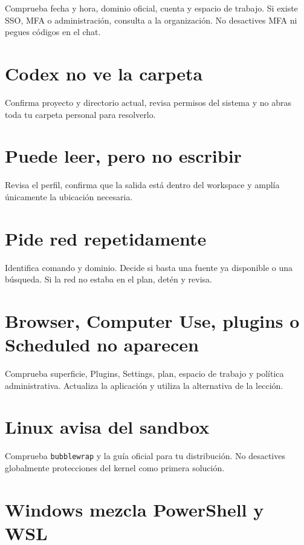 \documentclass[10pt,a4paper,openany]{book}
\begin{document}
Comprueba fecha y hora, dominio oficial, cuenta y espacio de trabajo. Si
existe SSO, MFA o administración, consulta a la organización. No
desactives MFA ni pegues códigos en el chat.

\section{Codex no ve la carpeta}\label{codex-no-ve-la-carpeta}

Confirma proyecto y directorio actual, revisa permisos del sistema y no
abras toda tu carpeta personal para resolverlo.

\section{Puede leer, pero no
escribir}\label{puede-leer-pero-no-escribir}

Revisa el perfil, confirma que la salida está dentro del workspace y
amplía únicamente la ubicación necesaria.

\section{Pide red repetidamente}\label{pide-red-repetidamente}

Identifica comando y dominio. Decide si basta una fuente ya disponible o
una búsqueda. Si la red no estaba en el plan, detén y revisa.

\section{Browser, Computer Use, plugins o Scheduled no
aparecen}\label{browser-computer-use-plugins-o-scheduled-no-aparecen}

Comprueba superficie, Plugins, Settings, plan, espacio de trabajo y
política administrativa. Actualiza la aplicación y utiliza la
alternativa de la lección.

\section{Linux avisa del sandbox}\label{linux-avisa-del-sandbox}

Comprueba \texttt{bubblewrap} y la guía oficial para tu distribución. No
desactives globalmente protecciones del kernel como primera solución.

\section{Windows mezcla PowerShell y
WSL}\label{windows-mezcla-powershell-y-wsl}
\end{document}
